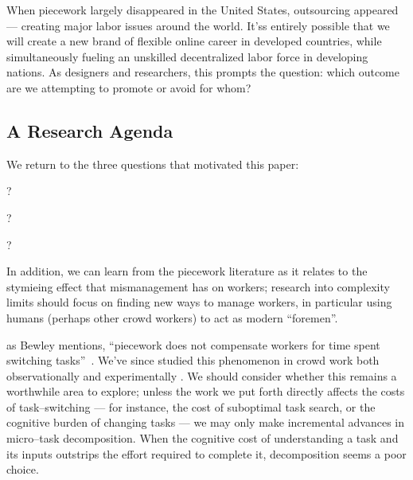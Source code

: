 \documentclass[pn4226]{subfiles}
\begin{document}
When piecework largely disappeared in the United States, outsourcing appeared --- creating major labor issues around the world.
It'ss entirely possible that we will create a new brand of flexible online career in developed countries,
while simultaneously fueling an unskilled decentralized labor force in developing nations.
As designers and researchers, this prompts the question: which outcome are we attempting to promote or avoid for whom?


\subsection{A Research Agenda}\label{sec:whatShouldBeTheFuture}
We return to the three questions that motivated this paper:
\begin{inlinelist}
  \item {}?
  \item {}?
  \item {}?
\end{inlinelist}

In addition, we can learn from the piecework literature as it relates to
the stymieing effect that mismanagement has on workers;
research into complexity limits should focus on finding new ways to manage workers,
in particular using humans (perhaps other crowd workers)
to act as modern ``foremen''.

as Bewley mentions,
``piecework does not compensate workers for time spent switching tasks''~\cite{bewley1999wages}. 
We've since studied this phenomenon in crowd work both
observationally \cite{taskSearch} and
experimentally \cite{delayAndOrderLasecki}.
We should consider whether this remains a worthwhile area to explore;
unless the work we put forth directly affects the costs of task--switching
--- for instance, the cost of suboptimal task search, or the cognitive burden of changing tasks ---
we may only make incremental advances in micro--task decomposition.
When the cognitive cost of understanding a task and its inputs outstrips the effort required to complete it, decomposition seems a poor choice.
\end{document}
